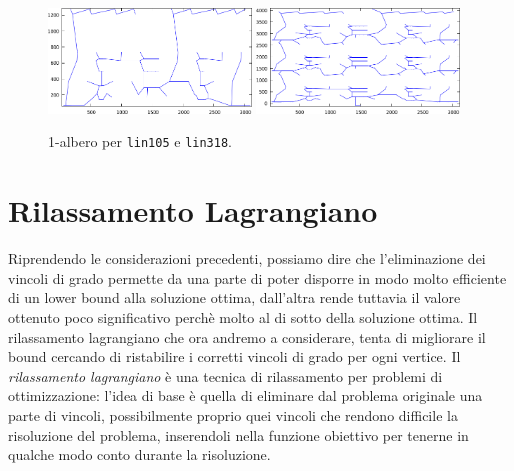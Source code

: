 \begin{figure}
  \begin{center}
    \includegraphics[width=0.48\textwidth]{images/1treelin105}
    \includegraphics[width=0.48\textwidth]{images/1treelin318}
    \caption{1-albero per \texttt{lin105} e \texttt{lin318}.}
    \label{fig:onetree}
  \end{center}
\end{figure}

\section{Rilassamento Lagrangiano} 
Riprendendo le considerazioni precedenti, possiamo dire che l'eliminazione dei vincoli di grado permette da una parte di poter disporre in modo molto efficiente di un lower bound alla soluzione ottima, dall'altra rende tuttavia il valore ottenuto poco significativo perchè molto al di sotto della soluzione ottima. Il rilassamento lagrangiano che ora andremo a considerare, tenta di migliorare il bound cercando di ristabilire i corretti vincoli di grado per ogni vertice.
Il \emph{rilassamento lagrangiano} è una tecnica di rilassamento per problemi di ottimizzazione: l'idea di base è quella di eliminare dal problema originale una parte di vincoli, possibilmente proprio quei vincoli che rendono difficile la risoluzione del problema, inserendoli nella funzione obiettivo per tenerne in qualche modo conto durante la risoluzione.

